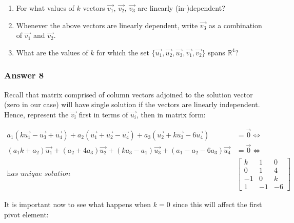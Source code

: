 \documentclass[11pt]{article}
\begin{document}
\begin{enumerate}
\item For what values of \(k\) vectors \(\vec{v_1}\), \(\vec{v_2}\), \(\vec{v_3}\) are
linearly (in-)dependent?
\item Whenever the above vectors are linearly dependent, write \(\vec{v_3}\) as a
combination of \(\vec{v_1}\) and \(\vec{v_2}\).
\item What are the values of \(k\) for which the set \(\{\vec{u_1}, \vec{u_2},
      \vec{u_3}, \vec{v_1}, \vec{v_2}\}\) spans \(\mathbb{R}^4\)?
\end{enumerate}

\subsubsection{Answer 8}
\label{sec:orgheadline11}
Recall that matrix comprised of column vectors adjoined to the solution
vector (zero in our case) will have single solution if the vectors are
linearly independent.  Hence, represent the \(\vec{v_i}\) first in terms of
\(\vec{u_i}\), then in matrix form:

\begin{align*}
  a_1(k\vec{u_1} - \vec{u_3} + \vec{u_4}) +
  a_2(\vec{u_1} + \vec{u_2} - \vec{u_4}) +
  a_3(\vec{u_2} + k\vec{u_3} - 6\vec{u_4}) &= \vec{0} \iff \\
  (a_1k + a_2)\vec{u_1} + 
  (a_2 + 4a_3)\vec{u_2} + 
  (ka_3 - a_1)\vec{u_3} + 
  (a_1 - a_2 - 6a_3)\vec{u_4} &= \vec{0} \iff \\
  \textit{has unique solution} &
                                 \begin{bmatrix}
                                   k  & 1  & 0 \\
                                   0  & 1  & 4 \\
                                   -1 & 0  & k \\
                                   1  & -1 & -6
                                 \end{bmatrix}
\end{align*}

It is important now to see what happens when \(k=0\) since this will affect
the first pivot element:
\end{document}
